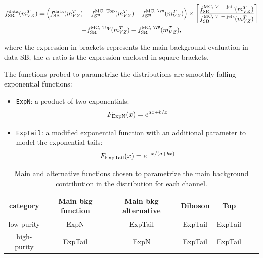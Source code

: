 

\begin{equation}
\begin{gathered}
  f_{\text{SR}}^{\text{data}}(\mtVZ) = \left( f_{\text{SB}}^{\text{data}}(\mtVZ) - f_{\text{SB}}^{\text{MC, Top}}(\mtVZ) - f_{\text{SB}}^{\text{MC, \VV}}(\mtVZ) \right) \times \left[ \frac{f_{\text{SR}}^{\text{MC, \V + jets}}(\mtVZ)}{f_{\text{SB}}^{\text{MC, \V + jets}}(\mtVZ)} \right] \\
  + f_{\text{SR}}^{\text{MC, Top}}(\mtVZ) + f_{\text{SR}}^{\text{MC, \VV}}(\mtVZ), \\
\end{gathered}
\label{eq:shape_3}
\end{equation}

\noindent where the expression in brackets represents the main background evaluation in data SB; the $\alpha$-ratio is the expression enclosed in square brackets.

\noindent The functions probed to parametrize the \mtVZ distributions are smoothly falling exponential functions:

\begin{itemize}
  \item {\tt ExpN}: a product of two exponentials: $$F_{\rm ExpN}(x) = e^{ax+b/x}$$
  \item {\tt ExpTail}: a modified exponential function with an additional parameter to model the exponential tails: $$F_{\rm ExpTail}(x) = e^{-x/(a+bx)}$$
\end{itemize}

\begin{table}[!htb]
  \begin{center}
    \begin{tabular}{c|cccccc}
      category & Main bkg function & Main bkg alternative & Diboson & Top \\
      \hline
       \hline
       low-purity  & ExpN & ExpTail & ExpTail & ExpTail \\
      \hline
       high-purity  & ExpTail & ExpN & ExpTail & ExpTail \\
    \end{tabular}
  \end{center}
  \caption{Main and alternative functions chosen to parametrize the main background contribution in the \mtVZ distribution for each channel.}\label{tab:XMassFunctions}
\end{table}

